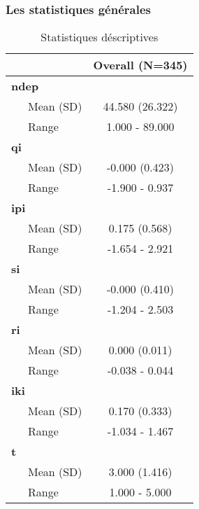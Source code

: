 \documentclass[11pt, a4paper]{article}
\begin{document}
\subsubsection{Les statistiques générales}
\FloatBarrier
\begin{table}[!htbp]
  \centering
\begin{tabular}{l|c}
  \hline
   & Overall (N=345)\\
  \hline
  \textbf{ndep} & \\
  \hline
  ~~~Mean (SD) & 44.580 (26.322)\\
  \hline
  ~~~Range & 1.000 - 89.000\\
  \hline
  \textbf{qi} & \\
  \hline
  ~~~Mean (SD) & -0.000 (0.423)\\
  \hline
  ~~~Range & -1.900 - 0.937\\
  \hline
  \textbf{ipi} & \\
  \hline
  ~~~Mean (SD) & 0.175 (0.568)\\
  \hline
  ~~~Range & -1.654 - 2.921\\
  \hline
  \textbf{si} & \\
  \hline
  ~~~Mean (SD) & -0.000 (0.410)\\
  \hline
  ~~~Range & -1.204 - 2.503\\
  \hline
  \textbf{ri} & \\
  \hline
  ~~~Mean (SD) & 0.000 (0.011)\\
  \hline
  ~~~Range & -0.038 - 0.044\\
  \hline
  \textbf{iki} & \\
  \hline
  ~~~Mean (SD) & 0.170 (0.333)\\
  \hline
  ~~~Range & -1.034 - 1.467\\
  \hline
  \textbf{t} & \\
  \hline
  ~~~Mean (SD) & 3.000 (1.416)\\
  \hline
  ~~~Range & 1.000 - 5.000\\
  \hline
  \end{tabular}
\caption{Statistiques déscriptives}
\end{table}
\FloatBarrier
\end{document}
